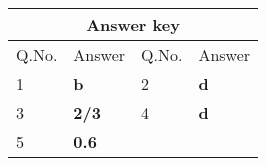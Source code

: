 \setlength\arrayrulewidth{1pt}
\begin{table}[H]
	\centering
	
	\begin{tabular}{|p{1.5cm}|p{1.5cm}||p{1.5cm}|p{1.5cm}|}
		\hline
		\multicolumn{4}{|c|}{\textbf{Answer key}}\\\hline\hline
		\rowcolor{ocrel}Q.No.&Answer&Q.No.&Answer\\\hline
		1&\textbf{b}&2&\textbf{d}\\\hline
		3&\textbf{2/3}&4&\textbf{d}\\\hline
		5&\textbf{0.6}&&\\\hline
	\end{tabular}
\end{table}
